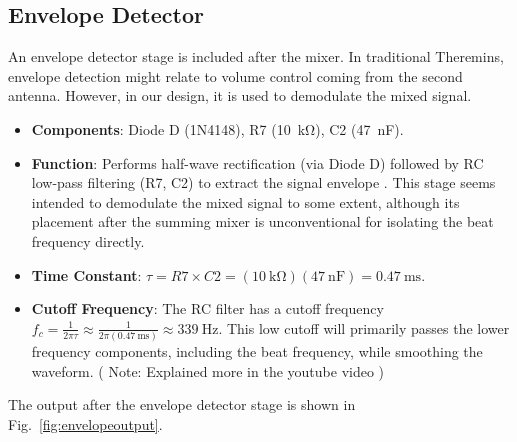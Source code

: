 \documentclass[conference]{IEEEtran}
\begin{document}
\subsection{Envelope Detector}
An envelope detector stage is included after the mixer. In traditional Theremins, envelope detection might relate to volume control coming from the second antenna. However, in our design, it is used to demodulate the mixed signal.
\begin{itemize}
    \item \textbf{Components}: Diode D (1N4148), R7 (\SI{10}{\kilo\ohm}), C2 (\SI{47}{\nano\farad}).
    \item \textbf{Function}: Performs half-wave rectification (via Diode D) followed by RC low-pass filtering (R7, C2) to extract the signal envelope \cite{envelope_ref}. This stage seems intended to demodulate the mixed signal to some extent, although its placement after the summing mixer is unconventional for isolating the beat frequency directly.
    \item \textbf{Time Constant}: $\tau = R7 \times C2 = (\SI{10}{\kilo\ohm})(\SI{47}{\nano\farad}) = \SI{0.47}{\milli\second}$.
    \item \textbf{Cutoff Frequency}: The RC filter has a cutoff frequency $f_c = \frac{1}{2\pi \tau} \approx \frac{1}{2\pi (\SI{0.47}{\milli\second})} \approx \SI{339}{\hertz}$. This low cutoff will primarily passes the lower frequency components, including the beat frequency, while smoothing the waveform. ( Note: Explained more in the youtube video \cite{project_video} )
\end{itemize}
The output after the envelope detector stage is shown in Fig.~\ref{fig:envelopeoutput}.
\end{document}
